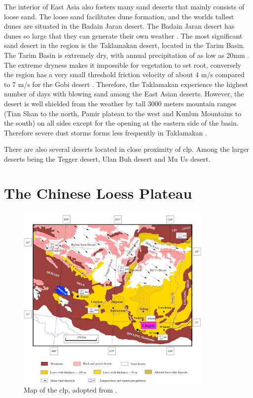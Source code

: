 The interior of East Asia also fosters many sand deserts that mainly consists of loose sand. 
The loose sand facilitates dune formation, and the worlds tallest dunes are situated in the Badain Jaran desert. 
The Badain Jaran desert has dunes so large that they can generate their own weather \parencite{dong2013investigation}. 
The most significant sand desert in the region is the Taklamakan desert, located in the Tarim Basin. 
The Tarim Basin is extremely dry, with annual precipitation of as low as 20mm \parencite{shao2006review}. 
The extreme dryness makes it impossible for vegetation to set root, conversely the region has a very small threshold friction velocity of about 4 m/s compared to 7 m/s for the Gobi desert \parencite{ShaoYaping2008PaMo}. 
Therefore, the Taklamakan experience the highest number of days with blowing sand among the East Asian deserts.
However, the desert is well shielded from the weather by tall 3000 meters mountain ranges (Tian Shan to the north, Pamir plateau to the west and Kunlun Mountains to the south) on all sides except for the opening at the eastern side of the basin. 
Therefore severe dust storms forms less frequently in Taklamakan \parencite{ShaoYaping2008PaMo}. 

There are also several deserts located in close proximity of \acrshort{clp}. Among the larger deserts being the Tegger desert, Ulan Buh desert and Mu Us desert. 

\section{The Chinese Loess Plateau}
\begin{figure}[htpb]

        \centering
        \includegraphics[width=0.85\textwidth]{texfiles/figs/loess_plateau_maps.jpg}
        

    \caption{Map of the \acrshort{clp}, adopted from \textcite{spassov2002loess}.}
    \label{fig:map_clp}
\end{figure}

